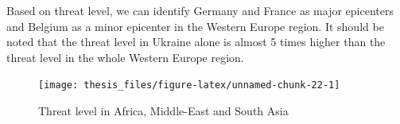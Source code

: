 \documentclass[11pt,oneside,a4paper]{reedthesis}
\newenvironment{Shaded}{\begin{snugshade}}{\end{snugshade}}
\newcommand{\KeywordTok}[1]{\textcolor[rgb]{0.13,0.29,0.53}{\textbf{#1}}}
\newcommand{\StringTok}[1]{\textcolor[rgb]{0.31,0.60,0.02}{#1}}
\newcommand{\OperatorTok}[1]{\textcolor[rgb]{0.81,0.36,0.00}{\textbf{#1}}}
\newcommand{\NormalTok}[1]{#1}
\begin{document}
Based on threat level, we can identify Germany and France as major
epicenters and Belgium as a minor epicenter in the Western Europe
region. It should be noted that the threat level in Ukraine alone is
almost 5 times higher than the threat level in the whole Western Europe
region.
\begin{Shaded}
\end{Shaded}
\begin{figure}
\texttt{[image: thesis\_files/figure-latex/unnamed-chunk-22-1]} \caption{Threat level in Africa, Middle-East and South Asia}\label{fig:unnamed-chunk-22}
\end{figure}
\end{document}
